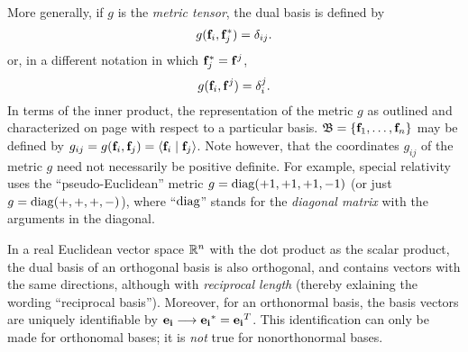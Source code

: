 More generally, if $g$ is the {\em metric tensor},
the dual basis is defined by
\begin{equation}
g( {\bf f}_i,{\bf f}_j^*)=\delta_{ij}.
\label{2011-m-Dualbasis-e2}
\end{equation}
or, in a different notation in which ${\bf f}_j^* = {\bf f}^j$,
\begin{equation}
g( {\bf f}_i,{\bf f}^j)=\delta_{i}^j.
\label{2011-m-Dualbasis-e3}
\end{equation}
In terms of the inner product, the representation
of the metric $g$ as outlined and characterized on page \pageref{2011-m-metrict} with respect to a particular basis.
${\frak B} = \{{\bf f}_1,\ldots , {\bf f}_n\}$
may be defined by $g_{ij}=g({\bf f}_i,{\bf f}_j)=\langle {\bf f}_i\mid {\bf f}_j\rangle$.
Note however, that the coordinates $g_{ij}$ of
the metric $g$ need not necessarily be positive definite.
For example,  special relativity uses the ``pseudo-Euclidean'' metric
 $g={\rm diag}(+1,+1,+1,-1)$ (or just $g={\rm diag}(+,+,+,-)$), where ``${\rm diag}$''
stands for the {\em diagonal matrix}
with the arguments in the diagonal.




In a real Euclidean vector space ${\Bbb R}^n$
with the dot product as the scalar product,
the dual basis of an orthogonal basis  is also orthogonal, and contains vectors with the same directions,
although with {\em reciprocal length} (thereby exlaining the wording ``reciprocal basis'').
Moreover, for an orthonormal basis, the basis vectors are uniquely identifiable by
${\bf e_i} \longrightarrow {\bf e_i}^* = {\bf e_i}^T$.
This identification can only be made for orthonomal bases; it is {\em not} true for nonorthonormal bases.

